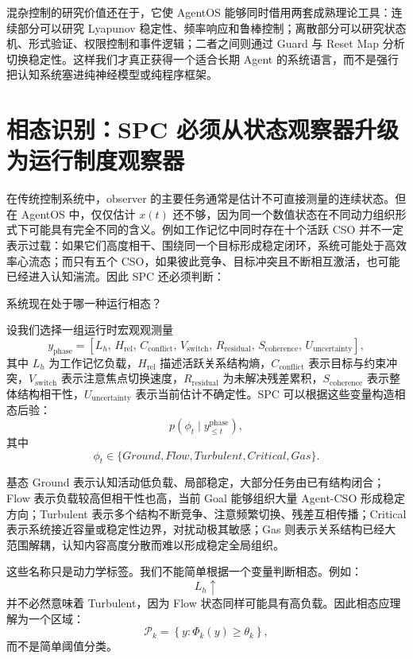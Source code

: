 混杂控制的研究价值还在于，它使 AgentOS 能够同时借用两套成熟理论工具：连续部分可以研究 Lyapunov 稳定性、频率响应和鲁棒控制；离散部分可以研究状态机、形式验证、权限控制和事件逻辑；二者之间则通过 Guard 与 Reset Map 分析切换稳定性。这样我们才真正获得一个适合长期 Agent 的系统语言，而不是强行把认知系统塞进纯神经模型或纯程序框架。

\section{相态识别：SPC 必须从状态观察器升级为运行制度观察器}

在传统控制系统中，observer 的主要任务通常是估计不可直接测量的连续状态。但在 AgentOS 中，仅仅估计 $x(t)$ 还不够，因为同一个数值状态在不同动力组织形式下可能具有完全不同的含义。例如工作记忆中同时存在十个活跃 CSO 并不一定表示过载：如果它们高度相干、围绕同一个目标形成稳定闭环，系统可能处于高效率心流态；而只有五个 CSO，如果彼此竞争、目标冲突且不断相互激活，也可能已经进入认知湍流。因此 SPC 还必须判断：
\begin{proposition*}
系统现在处于哪一种运行相态？
\end{proposition*}

设我们选择一组运行时宏观观测量
\[
y_{\mathrm{phase}}
=
[
L_h,\,
H_{\mathrm{rel}},\,
C_{\mathrm{conflict}},\,
V_{\mathrm{switch}},\,
R_{\mathrm{residual}},\,
S_{\mathrm{coherence}},\,
U_{\mathrm{uncertainty}}
],
\]
其中 $L_h$ 为工作记忆负载，$H_{\mathrm{rel}}$ 描述活跃关系结构熵，$C_{\mathrm{conflict}}$ 表示目标与约束冲突，$V_{\mathrm{switch}}$ 表示注意焦点切换速度，$R_{\mathrm{residual}}$ 为未解决残差累积，$S_{\mathrm{coherence}}$ 表示整体结构相干性，$U_{\mathrm{uncertainty}}$ 表示当前估计不确定性。SPC 可以根据这些变量构造相态后验：
\[
p
\left(
\phi_t
\mid
y_{\leq t}^{\mathrm{phase}}
\right),
\]
其中
\[
\phi_t
\in
\{
Ground,
Flow,
Turbulent,
Critical,
Gas
\}.
\]

基态 Ground 表示认知活动低负载、局部稳定，大部分任务由已有结构闭合；Flow 表示负载较高但相干性也高，当前 Goal 能够组织大量 Agent-CSO 形成稳定方向；Turbulent 表示多个结构不断竞争、注意频繁切换、残差互相传播；Critical 表示系统接近容量或稳定性边界，对扰动极其敏感；Gas 则表示关系结构已经大范围解耦，认知内容高度分散而难以形成稳定全局组织。

这些名称只是动力学标签。我们不能简单根据一个变量判断相态。例如：
\[
L_h\uparrow
\]
并不必然意味着 Turbulent，因为 Flow 状态同样可能具有高负载。因此相态应理解为一个区域：
\[
\mathcal P_k
=
\left\{
y:
\Phi_k(y)\geq\theta_k
\right\},
\]
而不是简单阈值分类。

